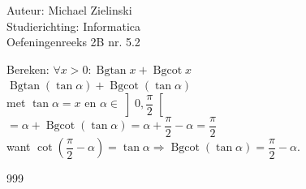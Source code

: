 \documentclass[a4paper]{article}
\newcommand{\Bgcot}{\operatorname{Bgcot}}
\newcommand{\Bgtan}{\operatorname{Bgtan}}
\begin{document}
\noindent \large Auteur: Michael Zielinski\\
\noindent \large Studierichting: Informatica\\
\noindent \large Oefeningenreeks 2B nr. 5.2\\

\medskip
\normalsize

Bereken: $\forall x>0: \Bgtan x+\Bgcot x$\\[6pt]

$\Bgtan\left(\tan\alpha\right)+\Bgcot\left(\tan\alpha\right)$\\

met $\tan\alpha=x$ en $\alpha\in\left]0,\dfrac{\pi}{2}\right[$\\

$=\alpha+\Bgcot\left(\tan\alpha\right)
   =\alpha+\dfrac{\pi}{2}-\alpha
   =\dfrac{\pi}{2}$\\

want $\cot\left(\dfrac{\pi}{2}-\alpha\right)=\tan\alpha
      \Rightarrow
      \Bgcot\left(\tan\alpha\right)=\dfrac{\pi}{2}-\alpha$.\\

\begin{thebibliography}{999}
\end{thebibliography}
\end{document}
